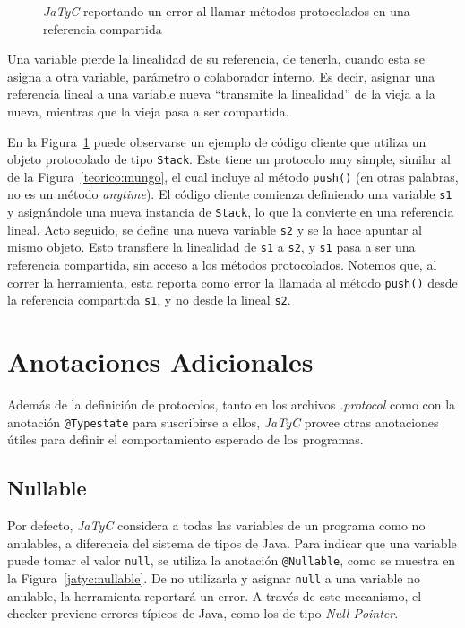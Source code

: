 \begin{figure}[htbp]
    \centering
    
    \vspace{0.3cm}
    
    \caption{\textit{JaTyC} reportando un error al llamar métodos protocolados en una referencia compartida}
    \label{jatyc:aliasing}
\end{figure}

Una variable pierde la linealidad de su referencia, de tenerla, cuando esta se asigna a otra variable, parámetro o colaborador interno. Es decir, asignar una referencia lineal a una variable nueva ``transmite la linealidad'' de la vieja a la nueva, mientras que la vieja pasa a ser compartida.

En la Figura~\ref{jatyc:aliasing} puede observarse un ejemplo de código cliente que utiliza un objeto protocolado de tipo \texttt{Stack}. Este tiene un protocolo muy simple, similar al de la Figura~\ref{teorico:mungo}, el cual incluye al método \texttt{push()} (en otras palabras, no es un método \textit{anytime}). El código cliente comienza definiendo una variable \texttt{s1} y asignándole una nueva instancia de \texttt{Stack}, lo que la convierte en una referencia lineal. Acto seguido, se define una nueva variable \texttt{s2} y se la hace apuntar al mismo objeto. Esto transfiere la linealidad de \texttt{s1} a \texttt{s2}, y \texttt{s1} pasa a ser una referencia compartida, sin acceso a los métodos protocolados. Notemos que, al correr la herramienta, esta reporta como error la llamada al método \texttt{push()} desde la referencia compartida \texttt{s1}, y no desde la lineal \texttt{s2}.

\section{Anotaciones Adicionales}

Además de la definición de protocolos, tanto en los archivos \textit{.protocol} como con la anotación \texttt{@Typestate} para suscribirse a ellos, \textit{JaTyC} provee otras anotaciones útiles para definir el comportamiento esperado de los programas.

\subsection{Nullable}

Por defecto, \textit{JaTyC} considera a todas las variables de un programa como no anulables, a diferencia del sistema de tipos de Java. Para indicar que una variable puede tomar el valor \texttt{null}, se utiliza la anotación \texttt{@Nullable}, como se muestra en la Figura~\ref{jatyc:nullable}. De no utilizarla y asignar \texttt{null} a una variable no anulable, la herramienta reportará un error. A través de este mecanismo, el checker previene errores típicos de Java, como los de tipo \textit{Null Pointer}.

